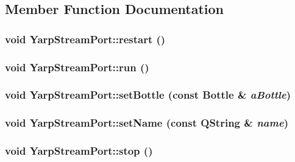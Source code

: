 \subsection{Member Function Documentation}
\hypertarget{class_yarp_stream_port_acc997d769ece47a6c88b1437225c0039}{
\subsubsection[{restart}]{\setlength{\rightskip}{0pt plus 5cm}void YarpStreamPort::restart ()}}
\label{class_yarp_stream_port_acc997d769ece47a6c88b1437225c0039}
\hypertarget{class_yarp_stream_port_aaeea4c0a2bae6c5a257935227df3cddb}{
\subsubsection[{run}]{\setlength{\rightskip}{0pt plus 5cm}void YarpStreamPort::run ()}}
\label{class_yarp_stream_port_aaeea4c0a2bae6c5a257935227df3cddb}
\hypertarget{class_yarp_stream_port_a6c55a434cf560c89f93d1a7d02b42a98}{
\subsubsection[{setBottle}]{\setlength{\rightskip}{0pt plus 5cm}void YarpStreamPort::setBottle (const Bottle \& {\em aBottle})}}
\label{class_yarp_stream_port_a6c55a434cf560c89f93d1a7d02b42a98}
\hypertarget{class_yarp_stream_port_a82197dfe08009bf57b9892ba8c091bbc}{
\subsubsection[{setName}]{\setlength{\rightskip}{0pt plus 5cm}void YarpStreamPort::setName (const QString \& {\em name})}}
\label{class_yarp_stream_port_a82197dfe08009bf57b9892ba8c091bbc}
\hypertarget{class_yarp_stream_port_ae1c105a567b759d0f0c0c0068e0279a1}{
\subsubsection[{stop}]{\setlength{\rightskip}{0pt plus 5cm}void YarpStreamPort::stop ()}}
\label{class_yarp_stream_port_ae1c105a567b759d0f0c0c0068e0279a1}


